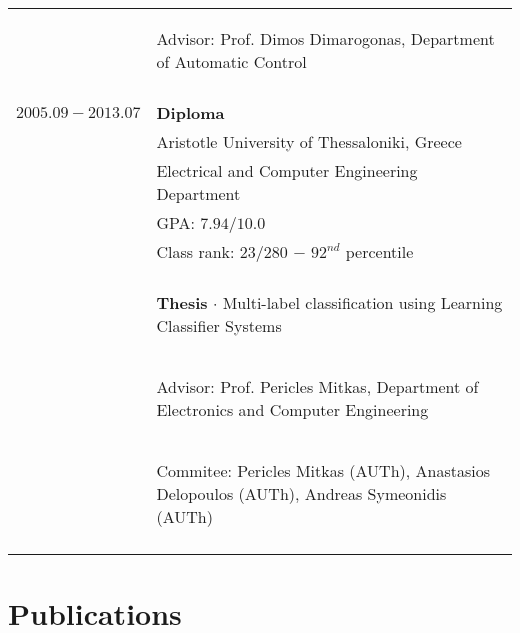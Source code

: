\documentclass[a4paper,10pt,twoside]{article}
\begin{document}
\begin{tabular}{rp{11cm}}
                     & \begin{small}Advisor: Prof. Dimos Dimarogonas, Department of Automatic Control\end{small} \\
&\\
$2005.09 - 2013.07$  & \textbf{Diploma} \\
                     & Aristotle University of Thessaloniki, Greece \\
                     & Electrical and Computer Engineering Department \\
                     & GPA: $7.94 / 10.0$ \\
                     & Class rank: $23 / 280$ $-$ $92^{nd}$ percentile \\
                     &\\
                     & \begin{small}\textbf{Thesis} $\cdot$ Multi-label classification using Learning Classifier Systems \end{small}\\
                     & \begin{small}Advisor: Prof. Pericles Mitkas, Department of Electronics and Computer Engineering\end{small}\\
                     & \begin{small}Commitee: Pericles Mitkas (AUTh), Anastasios Delopoulos (AUTh), Andreas Symeonidis (AUTh) \end{small}\\
&\\
\end{tabular}

\vspace*{\fill}
\newpage

\section{Publications}
\end{document}
